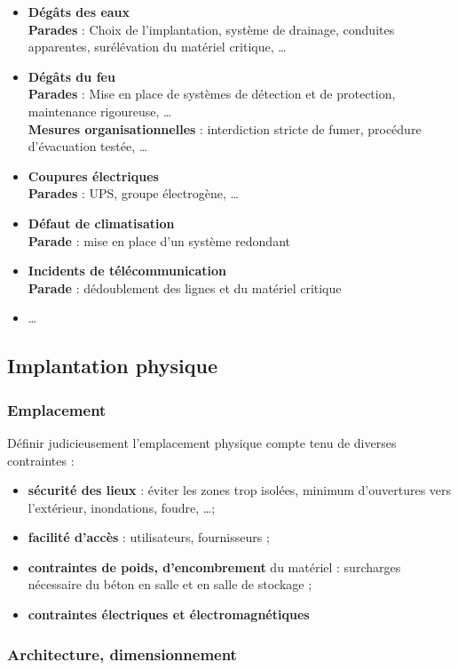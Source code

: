 \documentclass[10pt,a4paper,oneside,titlepage]{report}
\newcommand{\titre}[1]{\textcolor{title}{#1}}
\newcommand{\strong}[1]{\textbf{\titre{#1}}}
\begin{document}
\begin{itemize}
\item \strong{Dégâts des eaux}\\
\textbf{Parades} : Choix de l'implantation, système de drainage, conduites
apparentes, surélévation du matériel critique, \dots
\item \strong{Dégâts du feu}\\
\textbf{Parades} : Mise en place de systèmes de détection et de protection,
maintenance rigoureuse, \dots\\
\textbf{Mesures organisationnelles} : interdiction stricte de fumer, procédure
d'évacuation testée, \dots
\item \strong{Coupures électriques}\\
\textbf{Parades} : UPS, groupe électrogène, \dots
\item \strong{Défaut de climatisation}\\
\textbf{Parade} : mise en place d'un système redondant
\item \strong{Incidents de télécommunication}\\
\textbf{Parade} : dédoublement des lignes et du matériel critique
\item \dots
\end{itemize}

\subsection{Implantation physique}

\subsubsection{Emplacement}

Définir judicieusement l'emplacement physique compte tenu de diverses
contraintes :
\begin{itemize}
\item \strong{sécurité des lieux} : éviter les zones trop isolées, minimum
d'ouvertures vers l'extérieur, inondations, foudre, \dots ;
\item \strong{facilité d'accès} : utilisateurs, fournisseurs ;
\item \strong{contraintes de poids, d'encombrement} du matériel : surcharges
nécessaire du béton en salle et en salle de stockage ;
\item \strong{contraintes électriques et électromagnétiques}
\end{itemize}

\subsubsection{Architecture, dimensionnement}
\end{document}
